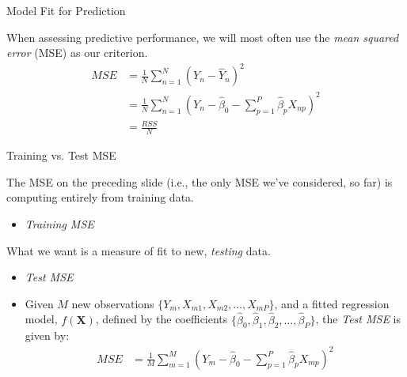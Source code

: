 \documentclass{beamer}\usepackage[]{graphicx}\usepackage[]{color}
\begin{document}

\begin{frame}{Model Fit for Prediction}
  
  When assessing predictive performance, we will most often use the \emph{mean
    squared error} (MSE) as our criterion.
  \vb
  \begin{align*}
    MSE &= \frac{1}{N} \sum_{n = 1}^N \left(Y_n - \hat{Y}_n\right)^2\\
    &= \frac{1}{N} \sum_{n = 1}^N \left(Y_n - \hat{\beta}_0 - 
    \sum_{p = 1}^P \hat{\beta}_p X_{np} \right)^2\\
    &= \frac{RSS}{N}
  \end{align*}
  
\end{frame}


\begin{frame}{Training vs. Test MSE}
  
  The MSE on the preceding slide (i.e., the only MSE we've considered, so far) 
  is computing entirely from training data.
  \vb
  \begin{itemize}
  \item \emph{Training MSE}
  \end{itemize}
  \vb
  What we want is a measure of fit to new, \emph{testing} data.
  \vb
  \begin{itemize}
  \item \emph{Test MSE}
    \vb
  \item Given $M$ new observations $\{Y_m, X_{m1}, X_{m2}, \ldots, X_{mP}\}$, 
    and a fitted regression model, $f(\mathbf{X})$, defined by the 
    coefficients $\{\hat{\beta}_0, \hat{\beta}_1, \hat{\beta}_2, \ldots, 
    \hat{\beta}_P\}$, the \emph{Test MSE} is given by:
    \begin{align*}
      MSE &= \frac{1}{M} \sum_{m = 1}^M \left(Y_m - \hat{\beta}_0 - 
      \sum_{p = 1}^P \hat{\beta}_p X_{mp} \right)^2\\
    \end{align*}
  \end{itemize}
  
\end{frame}

\watermarkoff %
\end{document}
